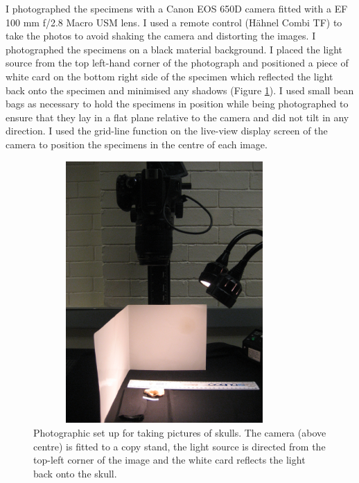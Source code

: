 	I photographed the specimens with a Canon EOS 650D camera fitted with a EF 100 mm f/2.8 Macro USM lens. I used a remote control (H\"ahnel Combi TF) to take the photos to avoid shaking the camera and distorting the images. I photographed the specimens on a black material background. I placed the light source from the top left-hand corner of the photograph and positioned a piece of white card on the bottom right side of the specimen which reflected the light back onto the specimen and minimised any shadows (Figure \ref{fig:camera}). I used small bean bags as necessary to hold the specimens in position while being photographed to ensure that they lay in a flat plane relative to the camera and did not tilt in any direction. I used the grid-line function on the live-view display screen of the camera to position the specimens in the centre of each image. 

\begin{figure}[h] 
  \centering
  \includegraphics[width=10cm, height=10cm, keepaspectratio=true]{Methods/figures/camera.jpg}
    \caption[Photographic set up]
    {Photographic set up for taking pictures of skulls. The camera (above centre) is fitted to a copy stand, the light source is directed from the top-left corner of the image and the white card reflects the light back onto the skull. }
  \label{fig:camera}
  \end{figure}

